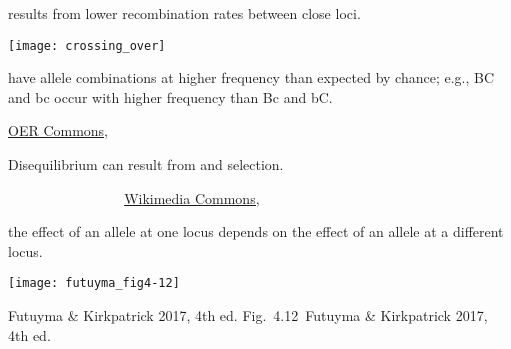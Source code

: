 \documentclass[t]{beamer}
\newcommand{\futuyma}[1]{%
	\ifthenelse{\isempty{#1}}%
	{Futuyma \& Kirkpatrick 2017, 4th ed.}%
	{Fig.~#1~Futuyma \& Kirkpatrick 2017, 4th ed.}%
}
\begin{document}
\begin{frame}[t]{ results from lower recombination rates between close loci.}

\vspace{-\baselineskip}

\begin{center}
\texttt{[image: crossing\_over]}
\end{center}

\hangpara {} have allele combinations at higher frequency than expected by chance; e.g., BC and bc occur with higher frequency than Bc and bC.

\vfilll

\tinyfill \href{https://www.oercommons.org/courseware/lesson/15023/overview}{OER Commons, }

\end{frame}


{
\begin{frame}[b]{Disequilibrium can result from  and selection.}

\vfilll

\tinynofill \textcolor{white}{\textit{Primulus vulgaris}, \href{https://commons.wikimedia.org/wiki/File:Prole\%C4\%87no\_cve\%C4\%87e_3.JPG}{Wikimedia Commons, }}
\end{frame}
}


\begin{frame}[t]{ the effect of an allele at one locus depends on the effect of an allele at a different locus.}

\centering
\texttt{[image: futuyma\_fig4-12]}



\vfilll


\tinyfill \futuyma{4.12}
\end{frame}

\end{document}
